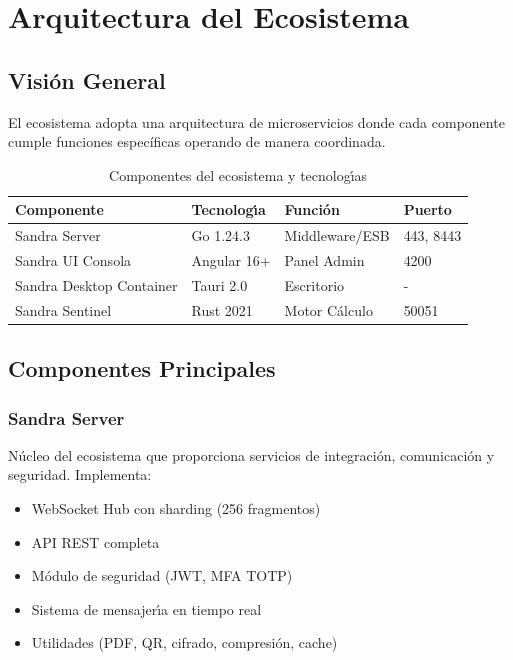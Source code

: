 \chapter{Arquitectura del Ecosistema}

\section{Visi\'on General}

El ecosistema adopta una arquitectura de microservicios donde cada componente cumple funciones espec\'ificas operando de manera coordinada.

\begin{table}[H]
\centering
\caption{Componentes del ecosistema y tecnolog\'{\i}as}
\begin{tabular}{|l|l|l|l|}
\hline
\textbf{Componente} & \textbf{Tecnolog\'{\i}a} & \textbf{Funci\'on} & \textbf{Puerto} \\ \hline
Sandra Server & Go 1.24.3 & Middleware/ESB & 443, 8443 \\ \hline
Sandra UI Consola & Angular 16+ & Panel Admin & 4200 \\ \hline
Sandra Desktop Container & Tauri 2.0 & Escritorio & - \\ \hline
Sandra Sentinel & Rust 2021 & Motor C\'alculo & 50051 \\ \hline
\end{tabular}
\end{table}

\section{Componentes Principales}

\subsection{Sandra Server}
N\'ucleo del ecosistema que proporciona servicios de integraci\'on, comunicaci\'on y seguridad. Implementa:
\begin{itemize}
\item WebSocket Hub con sharding (256 fragmentos)
\item API REST completa
\item M\'odulo de seguridad (JWT, MFA TOTP)
\item Sistema de mensajer\'{\i}a en tiempo real
\item Utilidades (PDF, QR, cifrado, compresi\'on, cache)
\end{itemize}

